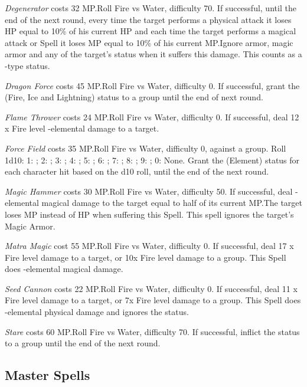 \begin{multicols}{2}
    \textit{Degenerator} costs 32 MP.\@{}Roll Fire vs Water, difficulty 70. If successful, until the end of the next round, every time the target performs a physical attack it loses HP equal to 10\% of his current HP and each time the target performs a magical attack or Spell it loses MP equal to 10\% of his current MP.\@{}Ignore armor, magic armor and any of the target’s status when it suffers this damage. This counts as a -type status.
    
    \textit{Dragon Force} costs 45 MP.\@{}Roll Fire vs Water, difficulty 0. If successful, grant the  (Fire, Ice and Lightning) status to a group until the end of next round.
    
    \textit{Flame Thrower} costs 24 MP.\@{}Roll Fire vs Water, difficulty 0. If successful, deal 12 x Fire level -elemental damage to a target.
    
	\textit{Force Field} costs 35 MP.\@{}Roll Fire vs Water, difficulty 0, against a group. Roll 1d10: 1: ; 2: ; 3: ; 4: ; 5: ; 6: ; 7: ; 8: ; 9: ; 0: None. Grant the (Element)  status for each character hit based on the d10 roll, until the end of the next round.
    
    \textit{Magic Hammer} costs 30 MP.\@{}Roll Fire vs Water, difficulty 50. If successful, deal -elemental magical damage to the target equal to half of its current MP.\@{}The target loses MP instead of HP when suffering this Spell. This spell ignores the target’s Magic Armor.
    
    \textit{Matra Magic} cost 55 MP.\@{}Roll Fire vs Water, difficulty 0. If successful, deal 17 x Fire level damage to a target, or 10x Fire level damage to a group. This Spell does -elemental magical damage.

    \textit{Seed Cannon} costs 22 MP.\@{}Roll Fire vs Water, difficulty 0. If successful, deal 11 x Fire level damage to a target, or 7x Fire level damage to a group. This Spell does -elemental physical damage and ignores the  status.
    
    \textit{Stare} costs 60 MP.\@{}Roll Fire vs Water, difficulty 70. If successful, inflict the  status to a group until the end of the next round.
    
\subsection{Master Spells}\label{subsec:blue-master}


\end{multicols}
